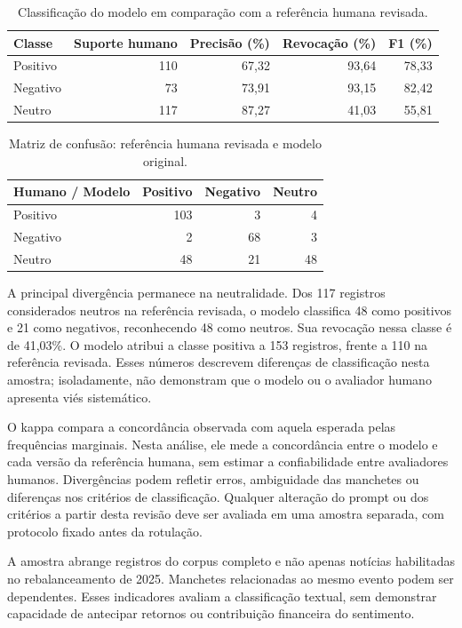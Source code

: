 \begin{table}[H]
\centering
\caption{Classificação do modelo em comparação com a referência humana revisada.}
\label{tab:sentimento_metricas_revisadas}
{\footnotesize
\begin{tabular}{@{}lrrrr@{}}
\hline
Classe & Suporte humano & Precisão (\%) & Revocação (\%) & F1 (\%) \\ \hline
Positivo & 110 & 67,32 & 93,64 & 78,33 \\
Negativo & 73 & 73,91 & 93,15 & 82,42 \\
Neutro & 117 & 87,27 & 41,03 & 55,81 \\
\hline
\end{tabular}}
\par{}
\end{table}

\begin{table}[H]
\centering
\caption{Matriz de confusão: referência humana revisada e modelo original.}
\label{tab:sentimento_confusao_revisada}
{\footnotesize
\begin{tabular}{@{}lrrr@{}}
\hline
Humano / Modelo & Positivo & Negativo & Neutro \\ \hline
Positivo & 103 & 3 & 4 \\
Negativo & 2 & 68 & 3 \\
Neutro & 48 & 21 & 48 \\
\hline
\end{tabular}}
\par{}
\end{table}

A principal divergência permanece na neutralidade. Dos 117 registros considerados neutros na referência revisada, o modelo classifica 48 como positivos e 21 como negativos, reconhecendo 48 como neutros. Sua revocação nessa classe é de 41,03\%. O modelo atribui a classe positiva a 153 registros, frente a 110 na referência revisada. Esses números descrevem diferenças de classificação nesta amostra; isoladamente, não demonstram que o modelo ou o avaliador humano apresenta viés sistemático.

O kappa compara a concordância observada com aquela esperada pelas frequências marginais. Nesta análise, ele mede a concordância entre o modelo e cada versão da referência humana, sem estimar a confiabilidade entre avaliadores humanos. Divergências podem refletir erros, ambiguidade das manchetes ou diferenças nos critérios de classificação. Qualquer alteração do prompt ou dos critérios a partir desta revisão deve ser avaliada em uma amostra separada, com protocolo fixado antes da rotulação.

A amostra abrange registros do corpus completo e não apenas notícias habilitadas no rebalanceamento de 2025. Manchetes relacionadas ao mesmo evento podem ser dependentes. Esses indicadores avaliam a classificação textual, sem demonstrar capacidade de antecipar retornos ou contribuição financeira do sentimento.

